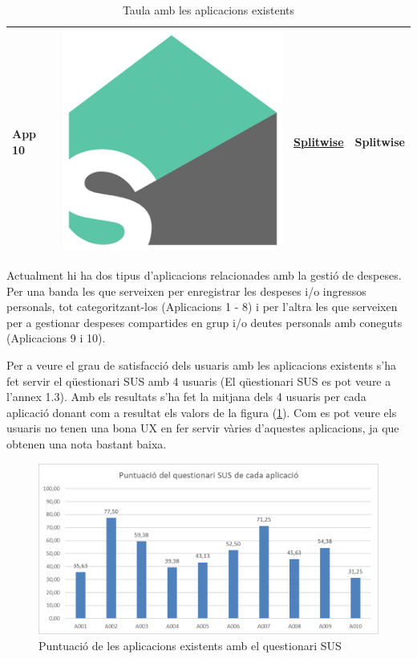 \begin{table}
\begin{tabular}{ | l | c | l | l | }
App 10 & \includegraphics[scale=0.05]{A11_icon.png} & \href{https://play.google.com/store/apps/details?id=com.Splitwise.SplitwiseMobile}{Splitwise} & Splitwise \\

\hline
\end{tabular} 
\caption{Taula amb les aplicacions existents}
\label{fig:apps}
\end{table}

Actualment hi ha dos tipus d'aplicacions relacionades amb la gestió de despeses. Per una banda les que serveixen per enregistrar les despeses i/o ingressos personals, tot categoritzant-los (Aplicacions 1 - 8) i per l'altra les que serveixen per a gestionar despeses compartides en grup i/o deutes personals amb coneguts (Aplicacions 9 i 10).

Per a veure el grau de satisfacció dels usuaris amb les aplicacions existents s'ha fet servir el qüestionari \gls{SUS} amb 4 usuaris (El qüestionari SUS es pot veure a l'annex 1.3). Amb els resultats s'ha fet la mitjana dels 4 usuaris per cada aplicació donant com a resultat els valors de la figura (\ref{fig:Apps_art_state}). Com es pot veure els usuaris no tenen una bona \ac{UX} en fer servir vàries d'aquestes aplicacions, ja que obtenen una nota bastant baixa.

\begin{figure}[htp]
\centering
\includegraphics[scale=0.8]{Apps_art_state_SUS.png}
\caption{Puntuació de les aplicacions existents amb el questionari SUS}\label{fig:Apps_art_state}
\end{figure}

